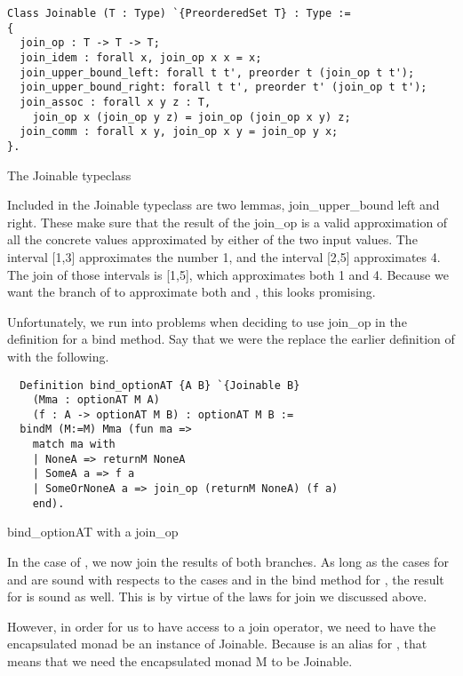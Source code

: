 \begin{listing}
\begin{verbatim}
Class Joinable (T : Type) `{PreorderedSet T} : Type :=
{
  join_op : T -> T -> T;
  join_idem : forall x, join_op x x = x;
  join_upper_bound_left: forall t t', preorder t (join_op t t');
  join_upper_bound_right: forall t t', preorder t' (join_op t t');
  join_assoc : forall x y z : T, 
    join_op x (join_op y z) = join_op (join_op x y) z;
  join_comm : forall x y, join_op x y = join_op y x;
}.
\end{verbatim}
\caption{The Joinable typeclass}
\label{lst:joinable_typeclass}
\end{listing}

Included in the Joinable typeclass are two lemmas, join\_upper\_bound left and
right. These make sure that the result of the join\_op is a valid approximation
of all the concrete values approximated by either of the two input values. 
The interval [1,3] approximates the number 1, and the interval [2,5]
approximates 4. The join of those intervals is [1,5], which approximates both 1
and 4. Because we want the branch of  to approximate both
 and , this looks promising.

Unfortunately, we run into problems when deciding to use join\_op in the
definition for a bind method. Say that we were the replace the earlier
definition of  with the following.

\begin{listing}[H]
\begin{verbatim}
  Definition bind_optionAT {A B} `{Joinable B}
    (Mma : optionAT M A)
    (f : A -> optionAT M B) : optionAT M B :=
  bindM (M:=M) Mma (fun ma =>
    match ma with
    | NoneA => returnM NoneA
    | SomeA a => f a
    | SomeOrNoneA a => join_op (returnM NoneA) (f a)
    end).
\end{verbatim}
\caption{bind\_optionAT with a join\_op}
\label{lst:bind_optionAT_join}
\end{listing}

In the case of , we now join the results of both branches. As long
as the cases for  and  are sound with respects to the 
cases  and  in the bind method for , 
the result for  is sound
as well. This is by virtue of the laws for join we discussed above.

However, in order for us to have access to a join operator, we need to have the
encapsulated monad be an instance of Joinable. Because  is 
an alias for , that means that we need the
encapsulated monad M to be Joinable. 

